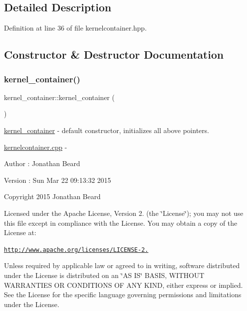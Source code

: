 \subsection{Detailed Description}


Definition at line 36 of file kernelcontainer.\+hpp.



\subsection{Constructor \& Destructor Documentation}
\hypertarget{classkernel__container_a273d59eff9b9e269f1f9b231abc37b83}{}\label{classkernel__container_a273d59eff9b9e269f1f9b231abc37b83} 
\subsubsection{\texorpdfstring{kernel\+\_\+container()}{kernel\_container()}\hspace{0.1cm}{\footnotesize\ttfamily [1/2]}}
{\footnotesize\ttfamily kernel\+\_\+container\+::kernel\+\_\+container (\begin{DoxyParamCaption}{ }\end{DoxyParamCaption})}

\hyperlink{classkernel__container}{kernel\+\_\+container} -\/ default constructor, initializes all above pointers.

\hyperlink{kernelcontainer_8cpp_source}{kernelcontainer.\+cpp} -\/ \begin{DoxyAuthor}{Author}
\+: Jonathan Beard 
\end{DoxyAuthor}
\begin{DoxyVersion}{Version}
\+: Sun Mar 22 09\+:13\+:32 2015
\end{DoxyVersion}
Copyright 2015 Jonathan Beard

Licensed under the Apache License, Version 2. (the \char`\"{}\+License\char`\"{}); you may not use this file except in compliance with the License. You may obtain a copy of the License at\+:

\href{http://www.apache.org/licenses/LICENSE-2.0}{\tt http\+://www.\+apache.\+org/licenses/\+L\+I\+C\+E\+N\+S\+E-\/2.}

Unless required by applicable law or agreed to in writing, software distributed under the License is distributed on an \char`\"{}\+A\+S I\+S\char`\"{} B\+A\+S\+IS, W\+I\+T\+H\+O\+UT W\+A\+R\+R\+A\+N\+T\+I\+ES OR C\+O\+N\+D\+I\+T\+I\+O\+NS OF A\+NY K\+I\+ND, either express or implied. See the License for the specific language governing permissions and limitations under the License. 

